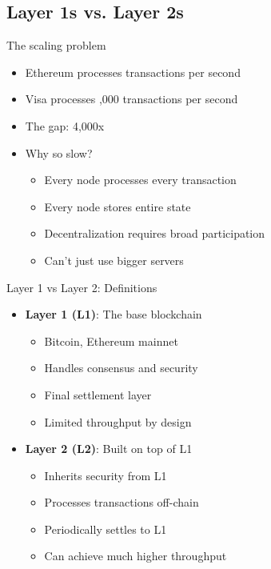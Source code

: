 \documentclass[aspectratio=169, lualatex, handout]{beamer}
\begin{document}
\subsection{Layer 1s vs. Layer 2s}

\begin{frame}{The scaling problem}
	\begin{itemize}
		\item Ethereum processes  transactions per second
		\item Visa processes ,000 transactions per second
		\item The gap: 4,000x
		\item Why so slow?
		      \begin{itemize}
			      \item Every node processes every transaction
			      \item Every node stores entire state
			      \item Decentralization requires broad participation
			      \item Can't just use bigger servers
		      \end{itemize}
	\end{itemize}
\end{frame}

\begin{frame}{Layer 1 vs Layer 2: Definitions}
	\begin{itemize}
		\item \textbf{Layer 1 (L1)}: The base blockchain
		      \begin{itemize}
			      \item Bitcoin, Ethereum mainnet
			      \item Handles consensus and security
			      \item Final settlement layer
			      \item Limited throughput by design
		      \end{itemize}
		\item \textbf{Layer 2 (L2)}: Built on top of L1
		      \begin{itemize}
			      \item Inherits security from L1
			      \item Processes transactions off-chain
			      \item Periodically settles to L1
			      \item Can achieve much higher throughput
		      \end{itemize}
	\end{itemize}
\end{frame}
\end{document}

